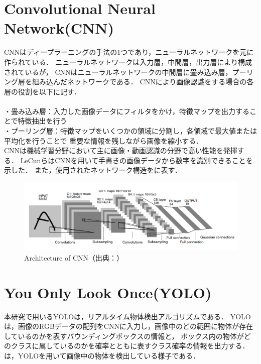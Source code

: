 \documentclass[../main]{subfiles}
\begin{document}
        \newpage
        
        \section{Convolutional Neural Network(CNN)}
        CNNはディープラーニングの手法の1つであり，ニューラルネットワークを元に作られている．
        ニューラルネットワークは入力層，中間層，出力層により構成されているが，
        CNNはニューラルネットワークの中間層に畳み込み層，プーリング層を組み込んだネットワークである．
        CNNにより画像認識をする場合の各層の役割を以下に記す．\\\\
        ・畳み込み層：入力した画像データにフィルタをかけ，特徴マップを出力することで特徴抽出を行う\\
        ・プーリング層：特徴マップをいくつかの領域に分割し，各領域で最大値または平均化を行うことで
        重要な情報を残しながら画像を縮小する．\\


        CNNは機械学習分野において主に画像・動画認識の分野で高い性能を発揮する．
        LeCunら\cite{cnn_paper}はCNNを用いて手書きの画像データから数字を識別できることを示した．
        また，使用されたネットワーク構造をに表す．

        \begin{figure}[H]
         \centering
         \includegraphics[width=15cm]{../images/cnn_exp.png}
         \caption{Architecture of CNN（出典：\cite{cnn_paper}）}
         \label{figure::cnn}
        \end{figure}

        \newpage

        \section{You Only Look Once(YOLO)}
        本研究で用いるYOLO\cite{yolo_paper_v1}\cite{yolo_paper_v2}\cite{yolo_paper_v3}\cite{yolo_paper_v4}は，リアルタイム物体検出アルゴリズムである．
        YOLOは，画像のRGBデータの配列をCNNに入力し，画像中のどの範囲に物体が存在しているのかを表すバウンディングボックスの情報と，
        ボックス内の物体がどのクラスに属しているのかを確率とともに表すクラス確率の情報を出力する．
        は，YOLOを用いて画像中の物体を検出している様子である． 
\end{document}
